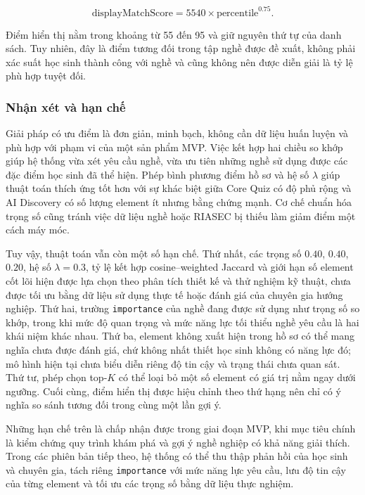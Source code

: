 \begin{equation}
	\text{displayMatchScore}
	=
	55
40 \times \text{percentile}^{0.75}.
\end{equation}

Điểm hiển thị nằm trong khoảng từ 55 đến 95 và giữ nguyên thứ tự của danh sách. Tuy nhiên, đây là điểm tương đối trong tập nghề được đề xuất, không phải xác suất học sinh thành công với nghề và cũng không nên được diễn giải là tỷ lệ phù hợp tuyệt đối.

\subsubsection{Nhận xét và hạn chế}

Giải pháp có ưu điểm là đơn giản, minh bạch, không cần dữ liệu huấn luyện và phù hợp với phạm vi của một sản phẩm MVP. Việc kết hợp hai chiều so khớp giúp hệ thống vừa xét yêu cầu nghề, vừa ưu tiên những nghề sử dụng được các đặc điểm học sinh đã thể hiện. Phép bình phương điểm hồ sơ và hệ số $\lambda$ giúp thuật toán thích ứng tốt hơn với sự khác biệt giữa Core Quiz có độ phủ rộng và AI Discovery có số lượng element ít nhưng bằng chứng mạnh. Cơ chế chuẩn hóa trọng số cũng tránh việc dữ liệu nghề hoặc RIASEC bị thiếu làm giảm điểm một cách máy móc.

Tuy vậy, thuật toán vẫn còn một số hạn chế. Thứ nhất, các trọng số $0.40$, $0.40$, $0.20$, hệ số $\lambda=0.3$, tỷ lệ kết hợp cosine--weighted Jaccard và giới hạn số element cốt lõi hiện được lựa chọn theo phân tích thiết kế và thử nghiệm kỹ thuật, chưa được tối ưu bằng dữ liệu sử dụng thực tế hoặc đánh giá của chuyên gia hướng nghiệp. Thứ hai, trường \texttt{importance} của nghề đang được sử dụng như trọng số so khớp, trong khi mức độ quan trọng và mức năng lực tối thiểu nghề yêu cầu là hai khái niệm khác nhau. Thứ ba, element không xuất hiện trong hồ sơ có thể mang nghĩa chưa được đánh giá, chứ không nhất thiết học sinh không có năng lực đó; mô hình hiện tại chưa biểu diễn riêng độ tin cậy và trạng thái chưa quan sát. Thứ tư, phép chọn top-$K$ có thể loại bỏ một số element có giá trị nằm ngay dưới ngưỡng. Cuối cùng, điểm hiển thị được hiệu chỉnh theo thứ hạng nên chỉ có ý nghĩa so sánh tương đối trong cùng một lần gợi ý.

Những hạn chế trên là chấp nhận được trong giai đoạn MVP, khi mục tiêu chính là kiểm chứng quy trình khám phá và gợi ý nghề nghiệp có khả năng giải thích. Trong các phiên bản tiếp theo, hệ thống có thể thu thập phản hồi của học sinh và chuyên gia, tách riêng \texttt{importance} với mức năng lực yêu cầu, lưu độ tin cậy của từng element và tối ưu các trọng số bằng dữ liệu thực nghiệm.
